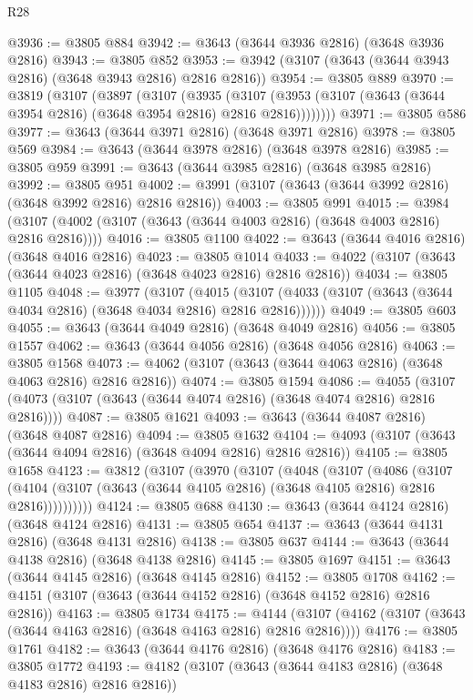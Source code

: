 \begin{lexlean}{R28}
\begin{coremodule}
@3936 := @3805 @884
@3942 := @3643 (@3644 @3936 @2816) (@3648 @3936 @2816)
@3943 := @3805 @852
@3953 := @3942 (@3107 (@3643 (@3644 @3943 @2816) (@3648 @3943 @2816) @2816 @2816))
@3954 := @3805 @889
@3970 := @3819
    (@3107
      (@3897
        (@3107
          (@3935
            (@3107 (@3953 (@3107 (@3643 (@3644 @3954 @2816) (@3648 @3954 @2816) @2816 @2816))))))))
@3971 := @3805 @586
@3977 := @3643 (@3644 @3971 @2816) (@3648 @3971 @2816)
@3978 := @3805 @569
@3984 := @3643 (@3644 @3978 @2816) (@3648 @3978 @2816)
@3985 := @3805 @959
@3991 := @3643 (@3644 @3985 @2816) (@3648 @3985 @2816)
@3992 := @3805 @951
@4002 := @3991 (@3107 (@3643 (@3644 @3992 @2816) (@3648 @3992 @2816) @2816 @2816))
@4003 := @3805 @991
@4015 := @3984 (@3107 (@4002 (@3107 (@3643 (@3644 @4003 @2816) (@3648 @4003 @2816) @2816 @2816))))
@4016 := @3805 @1100
@4022 := @3643 (@3644 @4016 @2816) (@3648 @4016 @2816)
@4023 := @3805 @1014
@4033 := @4022 (@3107 (@3643 (@3644 @4023 @2816) (@3648 @4023 @2816) @2816 @2816))
@4034 := @3805 @1105
@4048 := @3977
    (@3107
      (@4015 (@3107 (@4033 (@3107 (@3643 (@3644 @4034 @2816) (@3648 @4034 @2816) @2816 @2816))))))
@4049 := @3805 @603
@4055 := @3643 (@3644 @4049 @2816) (@3648 @4049 @2816)
@4056 := @3805 @1557
@4062 := @3643 (@3644 @4056 @2816) (@3648 @4056 @2816)
@4063 := @3805 @1568
@4073 := @4062 (@3107 (@3643 (@3644 @4063 @2816) (@3648 @4063 @2816) @2816 @2816))
@4074 := @3805 @1594
@4086 := @4055 (@3107 (@4073 (@3107 (@3643 (@3644 @4074 @2816) (@3648 @4074 @2816) @2816 @2816))))
@4087 := @3805 @1621
@4093 := @3643 (@3644 @4087 @2816) (@3648 @4087 @2816)
@4094 := @3805 @1632
@4104 := @4093 (@3107 (@3643 (@3644 @4094 @2816) (@3648 @4094 @2816) @2816 @2816))
@4105 := @3805 @1658
@4123 := @3812
    (@3107
      (@3970
        (@3107
          (@4048
            (@3107
              (@4086
                (@3107
                  (@4104 (@3107 (@3643 (@3644 @4105 @2816) (@3648 @4105 @2816) @2816 @2816))))))))))
@4124 := @3805 @688
@4130 := @3643 (@3644 @4124 @2816) (@3648 @4124 @2816)
@4131 := @3805 @654
@4137 := @3643 (@3644 @4131 @2816) (@3648 @4131 @2816)
@4138 := @3805 @637
@4144 := @3643 (@3644 @4138 @2816) (@3648 @4138 @2816)
@4145 := @3805 @1697
@4151 := @3643 (@3644 @4145 @2816) (@3648 @4145 @2816)
@4152 := @3805 @1708
@4162 := @4151 (@3107 (@3643 (@3644 @4152 @2816) (@3648 @4152 @2816) @2816 @2816))
@4163 := @3805 @1734
@4175 := @4144 (@3107 (@4162 (@3107 (@3643 (@3644 @4163 @2816) (@3648 @4163 @2816) @2816 @2816))))
@4176 := @3805 @1761
@4182 := @3643 (@3644 @4176 @2816) (@3648 @4176 @2816)
@4183 := @3805 @1772
@4193 := @4182 (@3107 (@3643 (@3644 @4183 @2816) (@3648 @4183 @2816) @2816 @2816))

\end{coremodule}
\end{lexlean}
